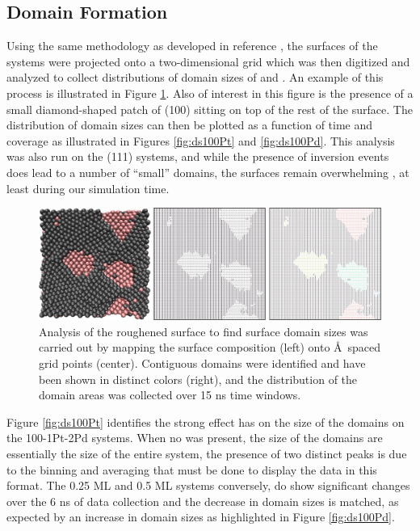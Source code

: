 \subsection{Domain Formation}
Using the same methodology as developed in reference \citep{Michalka:2015aa},
the surfaces of the systems were projected onto a two-dimensional grid which
was then digitized and analyzed to collect distributions of domain sizes of
 and . An example of this process is illustrated in Figure
\ref{fig:surfaceGrid}. Also of interest in this figure is the presence of a
small diamond-shaped patch of (100)  sitting on top of the rest of the
 surface. The distribution of domain sizes can then be plotted as a
function of time and  coverage as illustrated in Figures
\ref{fig:ds100Pt} and \ref{fig:ds100Pd}. This analysis was also run on the
(111) systems, and while the presence of inversion events does lead to a number
of ``small''  domains, the surfaces remain overwhelming , at
least during our simulation time.

\begin{landscape}
\begin{figure}[p!]
\centering
  \includegraphics[width=\linewidth]{../figures/appC/grid_small.pdf}
  \caption{Analysis of the roughened surface to find surface domain sizes was
carried out by mapping the surface composition (left) onto \AA\ spaced grid
points (center). Contiguous domains were identified and have been shown in
distinct colors (right), and the distribution of the domain areas was collected
over 15 ns time windows.}
\label{fig:surfaceGrid}
\end{figure}
\end{landscape}

Figure \ref{fig:ds100Pt} identifies the strong effect  has on the size
of the  domains on the 100-1Pt-2Pd systems. When no  was present,
the size of the domains are essentially the size of the entire system, the
presence of two distinct peaks is due to the binning and averaging that must be
done to display the data in this format. The 0.25 ML and 0.5 ML systems
conversely, do show significant changes over the 6 ns of data collection and
the decrease in  domain sizes is matched, as expected by an increase in
 domain sizes as highlighted in Figure \ref{fig:ds100Pd}. 

